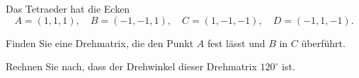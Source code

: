 Das Tetraeder hat die Ecken
\[
A=(1,1,1),\quad
B=(-1,-1,1),\quad
C=(1,-1,-1),\quad
D=(-1,1,-1).
\]
\begin{center}
\end{center}
\begin{teilaufgaben}
\item Finden Sie eine Drehmatrix, die den Punkt $A$ fest lässt und $B$ in $C$
überführt.
\item Rechnen Sie nach, dass der Drehwinkel dieser Drehmatrix $120^\circ$ ist.
\end{teilaufgaben}


